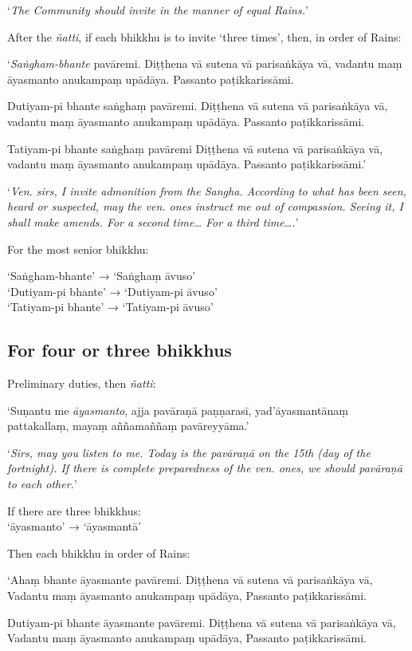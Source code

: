 ‘\emph{The Community should invite in the manner of equal Rains.}’

After the \emph{ñatti}, if each bhikkhu is to invite ‘three times’, then, in
order of Rains:

‘\emph{Saṅgham-bhante} pavāremi. Diṭṭhena vā sutena vā parisaṅkāya vā, vadantu
maṃ āyasmanto anukampaṃ upādāya. Passanto paṭikkarissāmi.

Dutiyam-pi bhante saṅghaṃ pavāremi. Diṭṭhena vā sutena vā parisaṅkāya vā,
vadantu maṃ āyasmanto anukampaṃ upādāya. Passanto paṭikkarissāmi.

Tatiyam-pi bhante saṅghaṃ pavāremi Diṭṭhena vā sutena vā parisaṅkāya vā, vadantu
maṃ āyasmanto anukampaṃ upādāya. Passanto paṭikkarissāmi.’

‘\emph{Ven. sirs, I invite admonition from the Sangha. According to what has
  been seen, heard or suspected, may the ven. ones instruct me out of
  compassion. Seeing it, I shall make amends. For a second time… For a third
  time….}’

For the most senior bhikkhu:

‘Saṅgham-bhante’ → ‘Saṅghaṃ āvuso’\\
‘Dutiyam-pi bhante’ → ‘Dutiyam-pi āvuso’\\
‘Tatiyam-pi bhante’ → ‘Tatiyam-pi āvuso’

\subsection{For four or three bhikkhus}

Preliminary duties, then \emph{ñatti}:

‘Suṇantu me \emph{āyasmanto}, ajja pavāraṇā paṇṇarasī, yad'āyasmantānaṃ
pattakallaṃ, mayaṃ aññamaññaṃ pavāreyyāma.’

‘\emph{Sirs, may you listen to me. Today is the pavāraṇā on the 15th (day of the
fortnight). If there is complete preparedness of the ven. ones, we should
pavāraṇā to each other.}’


If there are three bhikkhus:\\
‘āyasmanto’ → ‘āyasmantā’

Then each bhikkhu in order of Rains:

‘Ahaṃ bhante āyasmante pavāremi. Diṭṭhena vā sutena vā parisaṅkāya vā, Vadantu
maṃ āyasmanto anukampaṃ upādāya, Passanto paṭikkarissāmi.

Dutiyam-pi bhante āyasmante pavāremi. Diṭṭhena vā sutena vā parisaṅkāya vā,
Vadantu maṃ āyasmanto anukampaṃ upādāya, Passanto paṭikkarissāmi.

